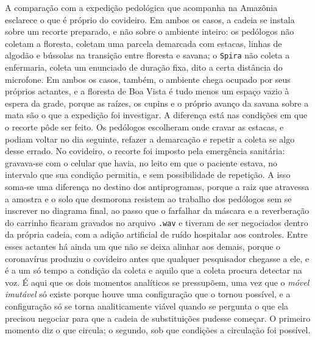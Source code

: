 A comparação com a expedição pedológica que \textcite{Latour2017Esperanca} acompanha na Amazônia esclarece o que é próprio do covideiro. Em ambos os casos, a cadeia se instala sobre um recorte preparado, e não sobre o ambiente inteiro: os pedólogos não coletam a floresta, coletam uma parcela demarcada com estacas, linhas de algodão e bússolas na transição entre floresta e savana; o \texttt{Spira} não coleta a enfermaria, coleta um enunciado de duração fixa, dito a certa distância do microfone. Em ambos os casos, também, o ambiente chega ocupado por seus próprios actantes, e a floresta de Boa Vista é tudo menos um espaço vazio à espera da grade, porque as raízes, os cupins e o próprio avanço da savana sobre a mata são o que a expedição foi investigar. A diferença está nas condições em que o recorte pôde ser feito. Os pedólogos escolheram onde cravar as estacas, e podiam voltar no dia seguinte, refazer a demarcação e repetir a coleta se algo desse errado. No covideiro, o recorte foi imposto pela emergência sanitária: gravava-se com o celular que havia, no leito em que o paciente estava, no intervalo que sua condição permitia, e sem possibilidade de repetição. A isso soma-se uma diferença no destino dos antiprogramas, porque a raiz que atravessa a amostra e o solo que desmorona resistem ao trabalho dos pedólogos sem se inscrever no diagrama final, ao passo que o farfalhar da máscara e a reverberação do carrinho ficaram gravados no arquivo \texttt{.wav} e tiveram de ser negociados dentro da própria cadeia, com a adição artificial de ruído hospitalar aos controles. Entre esses actantes há ainda um que não se deixa alinhar aos demais, porque o coronavírus produziu o covideiro antes que qualquer pesquisador chegasse a ele, e é a um só tempo a condição da coleta e aquilo que a coleta procura detectar na voz. É aqui que os dois momentos analíticos se pressupõem, uma vez que o \textit{móvel imutável} só existe porque houve uma configuração que o tornou possível, e a configuração só se torna analiticamente viável quando se pergunta o que ela precisou negociar para que a cadeia de substituições pudesse começar. O primeiro momento diz o que circula; o segundo, sob que condições a circulação foi possível.

